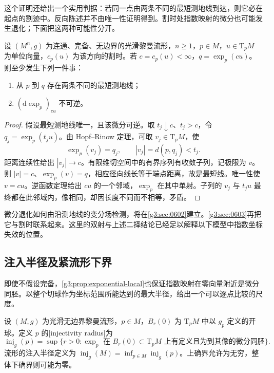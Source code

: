 这个证明还给出一个实用判据：若同一点由两条不同的最短测地线到达，则它必在起点的割迹中。反向陈述并不由唯一性证明得到。割时处指数映射的微分也可能发生退化；下面把这两种可能性分开。

\begin{proposition}\label{g3:prop:cut-endpoint-alternative}
	设 \((M^n,g)\) 为连通、完备、无边界的光滑黎曼流形，\(n\ge1\)，\(p\in M\)，\(u\in\mathrm T_pM\) 为单位向量，\(c_p(u)\) 为该方向的割时。若 \(c=c_p(u)<\infty\)，\(q=\exp_p(cu)\)。则至少发生下列一件事：
	\begin{enumerate}
		\item 从 \(p\) 到 \(q\) 存在两条不同的最短测地线；
		\item \((\mathrm d\exp_p)_{cu}\) 不可逆。
	\end{enumerate}
\end{proposition}
\begin{proof}
	假设最短测地线唯一，且该微分可逆。取 \(t_j\downarrow c\)、\(t_j>c\)，令 \(q_j=\exp_p(t_ju)\)。由 Hopf--Rinow 定理，可取 \(v_j\in \mathrm{T}_pM\)，使
	\[
		\exp_p(v_j)=q_j,\qquad |v_j|=d(p,q_j)<t_j.
	\]
	距离连续性给出 \(|v_j|\to c\)。有限维切空间中的有界序列有收敛子列，记极限为 \(v\)。则 \(|v|=c\)、\(\exp_p(v)=q\)，相应径向线长等于端点距离，故是最短线。唯一性使 \(v=cu\)。逆函数定理给出 \(cu\) 的一个邻域，\(\exp_p\) 在其中单射。子列的 \(v_j\) 与 \(t_ju\) 最终都在此邻域内，像相同，却因长度不同而不相等，矛盾。
\end{proof}

微分退化如何由沿测地线的变分场检测，将在\cref{g3:sec:0602}建立。\cref{g3:sec:0603}再把它与割时联系起来。这里的双射与上述二择结论已经足以解释以下模型中指数坐标失效的位置。

\subsection{注入半径及紧流形下界}
\label{g3:subsec:0204:03}
即使不假设完备，\cref{g3:prop:exponential-local}也保证指数映射在零向量附近是微分同胚。以整个切球作为坐标范围所能达到的最大半径，给出一个可以逐点比较的尺度。

\begin{definition}[注入半径]\label{g3:def:injectivity-radius}
	设 \((M,g)\) 为光滑无边界黎曼流形，\(p\in M\)，\(B_r(0)\) 为 \(\mathrm T_pM\) 中以 \(g_p\) 定义的开球。定义 \(p\) 的[injectivity radius]为
	\[
		\operatorname{inj}_g(p)=\sup\bigl\{r>0:\exp_p\text{ 在 }B_r(0)\subset \mathrm{T}_pM
		\text{ 上有定义且为到其像的微分同胚}\bigr\}.
	\]
	流形的注入半径定义为 \(\operatorname{inj}_g(M)=\inf_{p\in M}\operatorname{inj}_g(p)\)。上确界允许为无穷，整体下确界则可能为零。
\end{definition}

